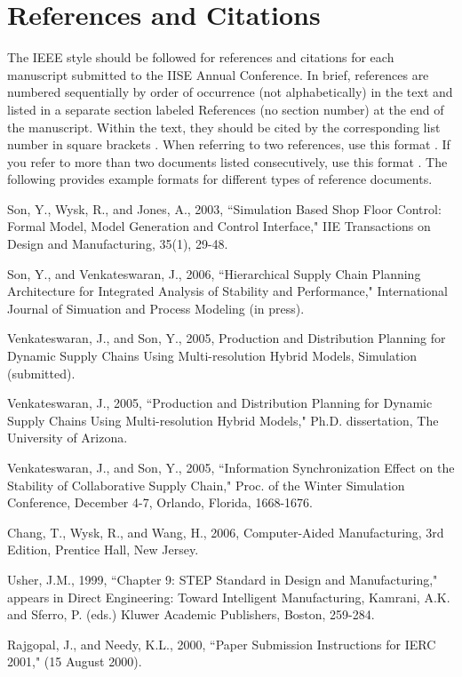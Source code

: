 \documentclass[review]{iise}%
\begin{document}
\section*{References and Citations}
The IEEE style should be followed for references and citations for each manuscript submitted to the IISE Annual Conference. In brief, references are numbered sequentially by order of occurrence (not alphabetically) in the text and listed in a separate section labeled References (no section number) at the end of the manuscript. Within the text, they should be cited by the corresponding list number in square brackets \cite{son03}.  When referring to two references, use this format \cite{son06,ven051}.  If you refer to more than two documents listed consecutively, use this format \cite{ven052,ven053,cha06,ush99,raj00}.   The following provides example formats for different types of reference documents.

\begin{thebibliography}{1}

Son, Y., Wysk, R., and Jones, A., 2003, \newblock ``Simulation Based Shop Floor Control: Formal Model, Model Generation and Control Interface," \newblock
IIE Transactions on Design and Manufacturing, 35(1), 29-48.

Son, Y., and Venkateswaran, J., 2006, \newblock ``Hierarchical Supply Chain Planning Architecture for Integrated Analysis of Stability and Performance," \newblock
International Journal of Simuation and Process Modeling (in press).

Venkateswaran, J., and Son, Y., 2005, Production and Distribution Planning for Dynamic Supply Chains Using Multi-resolution Hybrid Models, Simulation (submitted).

Venkateswaran, J., 2005, \newblock ``Production and Distribution Planning for Dynamic Supply Chains Using Multi-resolution Hybrid Models," \newblock
Ph.D. dissertation, The University of Arizona.

Venkateswaran, J., and Son, Y., 2005, \newblock ``Information Synchronization Effect on the Stability of Collaborative Supply Chain," \newblock
Proc. of the Winter Simulation Conference, December 4-7, Orlando, Florida, 1668-1676.

Chang, T., Wysk, R., and Wang, H., 2006, Computer-Aided Manufacturing, 3rd Edition, Prentice Hall, New Jersey.

Usher, J.M., 1999, \newblock ``Chapter 9: STEP Standard in Design and Manufacturing," \newblock
appears in Direct Engineering: Toward Intelligent Manufacturing, Kamrani, A.K. and Sferro, P. (eds.) Kluwer Academic Publishers, Boston, 259-284.

Rajgopal, J., and Needy, K.L., 2000, \newblock ``Paper Submission Instructions for IERC 2001," \newblock
(15 August 2000).

\end{thebibliography}
\end{document}
